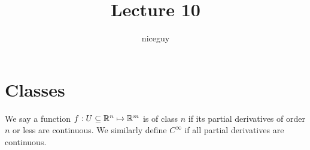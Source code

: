 \documentclass[12pt]{article}
\title{Lecture 10}
\author{niceguy}
\begin{document}
\maketitle

\section{Classes}

\begin{defn}[Class]
    We say a function $f:U\subseteq \mathbb{R}^n \mapsto \mathbb{R}^m$ is of class $n$ if its partial derivatives of order $n$ or less are continuous. We similarly define $C^\infty$ if all partial derivatives are continuous.
\end{defn}
\end{document}
